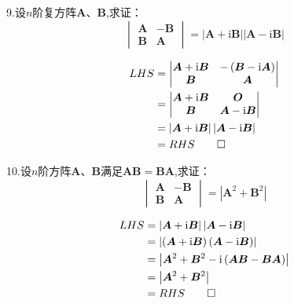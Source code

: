 9.设$n$阶复方阵$\bm{A}$、$\bm{B}$,求证：
\[
\begin{vmatrix}
	\bm{A}&-\bm{B}\\\bm{B}&\bm{A}
\end{vmatrix}=\left|\bm{A}+\mathrm{i}\bm{B}\right|\left|\bm{A}-\mathrm{i}\bm{B}\right|
\]
\begin{Proof}
\begin{align*}
	LHS&=\begin{vmatrix}
		\bm{A}+\mathrm{i}\bm{B}&-\left(\bm{B}-\mathrm{i}\bm{A}\right)\\
		\bm{B}&\bm{A}
	\end{vmatrix}\\
	&=\begin{vmatrix}
		\bm{A}+\mathrm{i}\bm{B}&\bm{O}\\
		\bm{B}&\bm{A}-\mathrm{i}\bm{B}
	\end{vmatrix}\\
	&=\left|\bm{A}+\mathrm{i}\bm{B}\right|\left|\bm{A}-\mathrm{i}\bm{B}\right|\\
	&=RHS\qedhere
\end{align*}
\end{Proof}

10.设$n$阶方阵$\bm{A}$、$\bm{B}$满足$\bm{AB}=\bm{BA}$,求证：
\[
\begin{vmatrix}
	\bm{A}&-\bm{B}\\\bm{B}&\bm{A}
\end{vmatrix}=\left|\bm{A}^2+\bm{B}^2\right|
\]
\begin{Proof}
\begin{align*}
	LHS&=\left|\bm{A}+\mathrm{i}\bm{B}\right|\left|\bm{A}-\mathrm{i}\bm{B}\right|
	\\
	&=\left|\left(\bm{A}+\mathrm{i}\bm{B}\right)\left(\bm{A}-\mathrm{i}\bm{B}\right)\right|\\
	&=\left|\bm{A}^2+\bm{B}^2-\mathrm{i}\left(\bm{AB}-\bm{BA}\right)\right|\\
	&=\left|\bm{A}^2+\bm{B}^2\right|\\
	&=RHS\qedhere
\end{align*}
\end{Proof}

